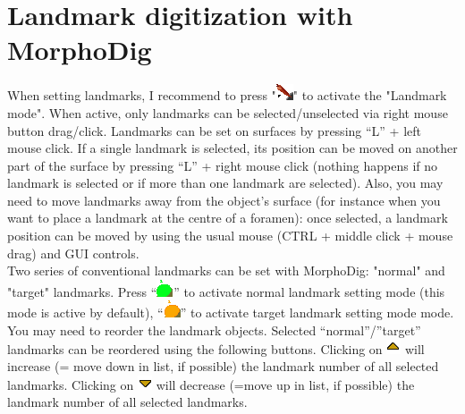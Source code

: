 \documentclass[12pt, a4paper]{book}
\begin{document}
\section{Landmark digitization with MorphoDig}
When setting landmarks, I recommend to press "\includegraphics[scale=0.7]{../images/04/Landmarks2.png}" to activate the "Landmark mode". When active,
only landmarks can be selected/unselected via right mouse button drag/click. Landmarks can be set
on surfaces by pressing “L” + left mouse click. If a single landmark is selected, its position can be moved
on another part of the surface by pressing “L” + right mouse click (nothing happens if no landmark
is selected or if more than one landmark are selected). Also, you may need to move landmarks away
from the object’s surface (for instance when you want to place a landmark at the centre of a foramen):
once selected, a landmark position can be moved by using the usual mouse (CTRL + middle click + mouse drag) and GUI controls.\\

Two series of conventional landmarks can be set with MorphoDig: "normal" and "target" landmarks.
Press “\includegraphics[scale=0.7]{../images/04/normal_landmarks.png}” to activate normal landmark setting mode (this mode is active by default), “\includegraphics[scale=0.7]{../images/04/target_landmarks.png}” to activate target landmark setting mode mode.
You may need to reorder the landmark objects. 
Selected “normal”/”target” landmarks can be reordered
using the following buttons. Clicking on \includegraphics[scale=0.7]{../images/06/objects/move_up.png} will increase (= move down in list, if possible) the landmark number of all selected landmarks. Clicking on \includegraphics[scale=0.7]{../images/06/objects/move_down.png} will decrease (=move up in list, if possible) the landmark number of all selected landmarks. 
\end{document}
